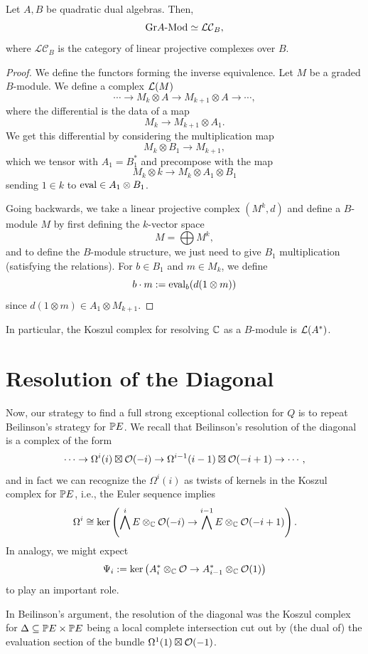 \documentclass[12pt]{article}
\newcommand{\LCom}{\mathcal{LC}}
\begin{document}
\begin{prop}
    Let $A,B$ be quadratic dual algebras. Then,
    \[\grlMod{A} \simeq \LCom_B,\]
    where $\LCom_B$ is the category of linear projective complexes over $B$.
\end{prop}
\begin{proof}
    We define the functors forming the inverse equivalence. Let $M$ be a graded $B$-module. We define a complex $\cL(M)$
    \[\cdots \to M_{k} \otimes A \to M_{k+1} \otimes A \to \cdots,\]
    where the differential is the data of a map
    \[M_{k} \to M_{k+1} \otimes A_1.\]
    We get this differential by considering the multiplication map
    \[M_k \otimes B_1 \to M_{k+1},\]
    which we tensor with $A_1=B_1^*$ and precompose with the map
    \[M_k \otimes k \to M_k \otimes A_1 \otimes B_1\]
    sending $1\in k$ to $\eval \in A_1\otimes B_1$.

    Going backwards, we take a linear projective complex $(M^k,d)$ and define a $B$-module $M$ by first defining the $k$-vector space
    \[M = \bigoplus M^k,\]
    and to define the $B$-module structure, we just need to give $B_1$ multiplication (satisfying the relations). For $b\in B_1$ and $m\in M_k$, we define
    \[b\cdot m \defeq \eval_b(d(1\otimes m))\]
    since $d(1\otimes m) \in A_1 \otimes M_{k+1}$.
\end{proof}

In particular, the Koszul complex for resolving $\C$ as a $B$-module is $\cL(A^*)$.


\section{Resolution of the Diagonal}

Now, our strategy to find a full strong exceptional collection for $Q$ is to repeat Beilinson's strategy for $\P E$. We recall that Beilinson's resolution of the diagonal is a complex of the form
\[\cdots \to \Omega^i(i) \boxtimes \cO(-i) \to \Omega^{i-1}(i-1) \boxtimes \cO(-i+1) \to \cdots,\]
and in fact we can recognize the $\Omega^i(i)$ as twists of kernels in the Koszul complex for $\P E$, i.e., the Euler sequence implies
\[\Omega^i \cong \ker\left(\bigwedge^i E \otimes_\C \cO(-i) \to \bigwedge^{i-1} E \otimes_\C \cO(-i+1)\right).\]
In analogy, we might expect
\[\Psi_i \defeq \ker\left(A_i^* \otimes_\C \cO \to A_{i-1}^* \otimes_\C \cO(1)\right)\]
to play an important role.

In Beilinson's argument, the resolution of the diagonal was the Koszul complex for $\Delta \subseteq \P E \times \P E$ being a local complete intersection cut out by (the dual of) the evaluation section of the bundle $\Omega^1(1) \boxtimes \cO(-1)$.
\end{document}

